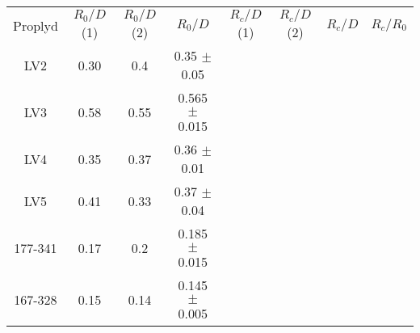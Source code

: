 \begin{table}
\begin{tabular}{|c|c|c|c|c|c|c|c|}
Proplyd & $R_0/D$ (1) & $R_0/D $ (2) & $R_0/D$ & $R_c/D$ (1) & $R_c/D $ (2)  & $R_c/D$  & $R_c/R_0$ \\
LV2     &   0.30  & 0.4  & 0.35  $\pm$ 0.05    & & & & \\
LV3     &   0.58  & 0.55 & 0.565 $\pm$ 0.015   & & & & \\
LV4     &   0.35  & 0.37 & 0.36  $\pm$ 0.01    & & & & \\
LV5     &   0.41  & 0.33 & 0.37  $\pm$ 0.04    & & & & \\
177-341 &   0.17  & 0.2  & 0.185 $\pm$ 0.015   & & & & \\
167-328 &   0.15  & 0.14 & 0.145 $\pm$ 0.005   & & & & 
\end{tabular}
\end{table}
